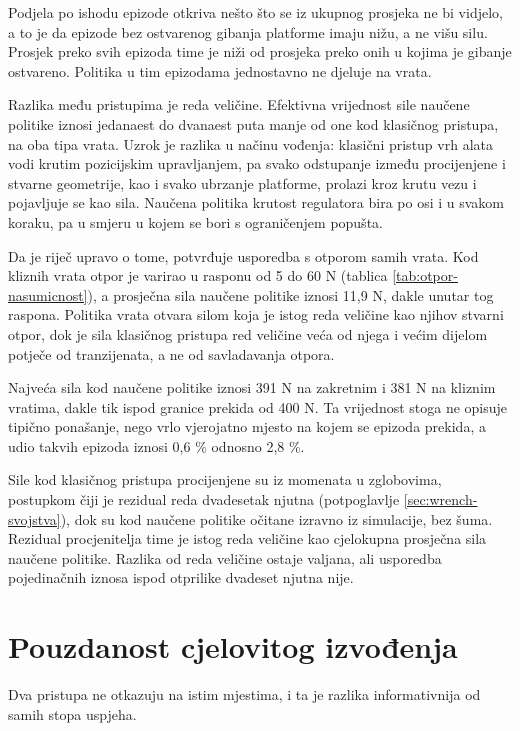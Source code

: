 Podjela po ishodu epizode otkriva nešto što se iz ukupnog prosjeka ne bi vidjelo, a to je da epizode bez
ostvarenog gibanja platforme imaju nižu, a ne višu silu. Prosjek preko svih epizoda time
je niži od prosjeka preko onih u kojima je gibanje ostvareno. Politika u tim epizodama jednostavno
ne djeluje na vrata.

Razlika među pristupima je reda veličine. Efektivna vrijednost sile naučene politike iznosi
jedanaest do dvanaest puta manje od one kod klasičnog pristupa, na oba tipa vrata. Uzrok
je razlika u načinu vođenja: klasični pristup vrh alata vodi krutim pozicijskim upravljanjem, pa
svako odstupanje između procijenjene i stvarne geometrije, kao i svako ubrzanje platforme,
prolazi kroz krutu vezu i pojavljuje se kao sila. Naučena politika krutost regulatora bira po osi
i u svakom koraku, pa u smjeru u kojem se bori s ograničenjem popušta.

Da je riječ upravo o tome, potvrđuje usporedba s otporom samih vrata. Kod kliznih vrata otpor je
varirao u rasponu od 5 do 60 N (tablica \ref{tab:otpor-nasumicnost}), a prosječna sila naučene
politike iznosi 11,9 N, dakle unutar tog raspona. Politika vrata otvara silom koja je istog reda
veličine kao njihov stvarni otpor, dok je sila klasičnog pristupa red veličine veća od njega i
većim dijelom potječe od tranzijenata, a ne od savladavanja otpora.

Najveća sila kod naučene politike iznosi 391 N na zakretnim i 381 N na kliznim vratima, dakle
tik ispod granice prekida od 400 N. Ta vrijednost stoga ne opisuje tipično ponašanje, nego vrlo vjerojatno
mjesto na kojem se epizoda prekida, a udio takvih epizoda iznosi 0,6 \% odnosno 2,8 \%.

Sile kod klasičnog pristupa procijenjene su iz momenata u zglobovima, postupkom čiji je rezidual
reda dvadesetak njutna (potpoglavlje \ref{sec:wrench-svojstva}), dok su kod naučene politike
očitane izravno iz simulacije, bez šuma. Rezidual procjenitelja time je istog reda veličine kao
cjelokupna prosječna sila naučene politike. Razlika od reda veličine ostaje valjana, ali usporedba
pojedinačnih iznosa ispod otprilike dvadeset njutna nije.

\section{Pouzdanost cjelovitog izvođenja}
\label{sec:pouzdanost}

Dva pristupa ne otkazuju na istim mjestima, i ta je razlika informativnija od samih stopa uspjeha.

